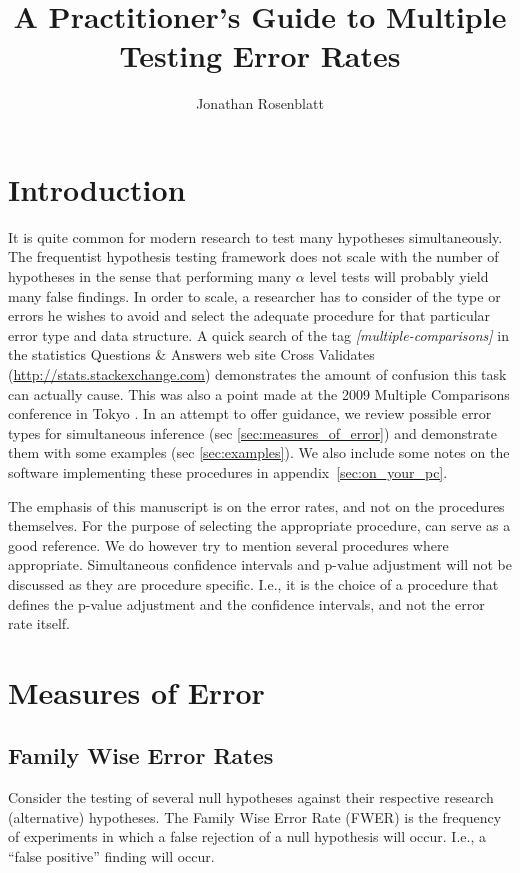 \documentclass[draft,12pt]{article}
\title{A Practitioner's Guide to Multiple Testing Error Rates}
\author{Jonathan Rosenblatt}
\date{}
\begin{document}
\maketitle


\section{Introduction}

It is quite common for modern research to test many hypotheses simultaneously. The frequentist hypothesis testing framework does not scale with the number of hypotheses in the sense that performing many $\alpha$ level tests will probably yield many false findings. In order to scale, a researcher has to consider of the type or errors he wishes to avoid and select the adequate procedure for that particular error type and data structure. A quick search of the tag \emph{[multiple-comparisons]} in the statistics Questions \& Answers web site Cross Validates (\url{http://stats.stackexchange.com}) demonstrates the amount of confusion this task can actually cause. This was also a point made at the 2009 Multiple Comparisons conference in Tokyo \citep{benjamini_simultaneous_2010}. 
In an attempt to offer guidance, we review possible error types for simultaneous inference (sec \ref{sec:measures_of_error}) and demonstrate them with some examples (sec \ref{sec:examples}). We also include some notes on the software implementing these procedures in appendix~\ref{sec:on_your_pc}.

The emphasis of this manuscript is on the error rates, and not on the procedures themselves. For the purpose of selecting the appropriate procedure, \citet{farcomeni_review_2008} can serve as a good reference. We do however try to mention several procedures where appropriate.  Simultaneous confidence intervals and p-value adjustment will not be discussed as they are procedure specific. I.e., it is the choice of a procedure that defines the p-value adjustment and the confidence intervals, and not the error rate itself.


\section{\label{sec:measures_of_error}Measures of Error}

\subsection{Family Wise Error Rates}
Consider the testing of several null hypotheses against their respective research (alternative) hypotheses. The Family Wise Error Rate (FWER) is the frequency of experiments in which a false rejection of a null hypothesis will occur. I.e., a ``false positive'' finding will occur.
\end{document}
